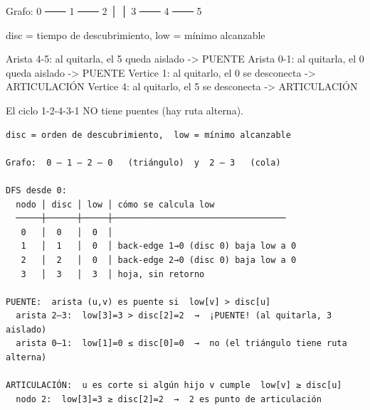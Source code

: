 \begin{dsadiagrama}
Grafo:
   0 ─── 1 ─── 2
         │     │
         3 ─── 4 ─── 5

disc = tiempo de descubrimiento, low = mínimo alcanzable

Arista 4-5: al quitarla, el 5 queda aislado -> PUENTE
Arista 0-1: al quitarla, el 0 queda aislado -> PUENTE
Vertice 1: al quitarlo, el 0 se desconecta -> ARTICULACIÓN
Vertice 4: al quitarlo, el 5 se desconecta -> ARTICULACIÓN

El ciclo 1-2-4-3-1 NO tiene puentes (hay ruta alterna).
\end{dsadiagrama}

\begin{dsacomofunciona}
\begin{verbatim}
disc = orden de descubrimiento,  low = mínimo alcanzable

Grafo:  0 — 1 — 2 — 0   (triángulo)  y  2 — 3   (cola)

DFS desde 0:
  nodo │ disc │ low │ cómo se calcula low
  ─────┼──────┼─────┼──────────────────────────────────
   0   │  0   │  0  │
   1   │  1   │  0  │ back-edge 1→0 (disc 0) baja low a 0
   2   │  2   │  0  │ back-edge 2→0 (disc 0) baja low a 0
   3   │  3   │  3  │ hoja, sin retorno

PUENTE:  arista (u,v) es puente si  low[v] > disc[u]
  arista 2—3:  low[3]=3 > disc[2]=2  →  ¡PUENTE! (al quitarla, 3 aislado)
  arista 0—1:  low[1]=0 ≤ disc[0]=0  →  no (el triángulo tiene ruta alterna)

ARTICULACIÓN:  u es corte si algún hijo v cumple  low[v] ≥ disc[u]
  nodo 2:  low[3]=3 ≥ disc[2]=2  →  2 es punto de articulación
\end{verbatim}
\end{dsacomofunciona}

